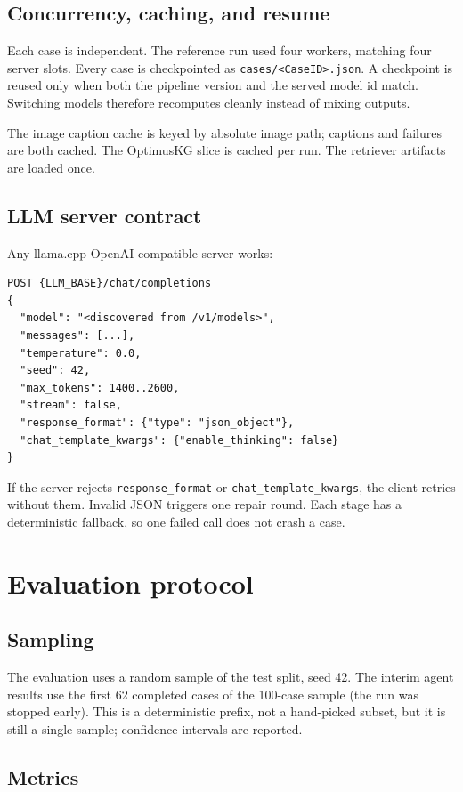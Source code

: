 \documentclass[11pt,a4paper]{article}
\newcommand{\code}[1]{\texttt{\small #1}}
\begin{document}
\subsection{Concurrency, caching, and resume}

Each case is independent. The reference run used four workers, matching four
server slots. Every case is checkpointed as
\code{cases/<CaseID>.json}. A checkpoint is reused only when both the pipeline
version and the served model id match. Switching models therefore recomputes
cleanly instead of mixing outputs.

The image caption cache is keyed by absolute image path; captions and failures are
both cached. The OptimusKG slice is cached per run. The retriever artifacts are
loaded once.

\subsection{LLM server contract}

Any llama.cpp OpenAI-compatible server works:
\begin{lstlisting}
POST {LLM_BASE}/chat/completions
{
  "model": "<discovered from /v1/models>",
  "messages": [...],
  "temperature": 0.0,
  "seed": 42,
  "max_tokens": 1400..2600,
  "stream": false,
  "response_format": {"type": "json_object"},
  "chat_template_kwargs": {"enable_thinking": false}
}
\end{lstlisting}
If the server rejects \code{response\_format} or \code{chat\_template\_kwargs}, the
client retries without them. Invalid JSON triggers one repair round. Each stage has
a deterministic fallback, so one failed call does not crash a case.

\section{Evaluation protocol}

\subsection{Sampling}

The evaluation uses a random sample of the test split, seed 42. The interim agent
results use the first 62 completed cases of the 100-case sample (the run was stopped
early). This is a deterministic prefix, not a hand-picked subset, but it is still a
single sample; confidence intervals are reported.

\subsection{Metrics}
\end{document}
